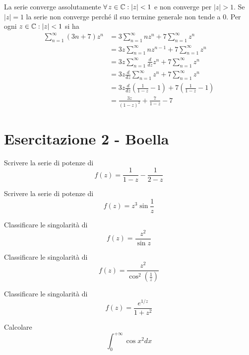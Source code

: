 La serie converge assolutamente $\forall z\in \CC  :\left| z\right| < 1$ e non converge per $\left| z\right|  > 1$. Se $\left| z\right| = 1$ la serie non converge perché il suo termine generale non tende a $0$. Per ogni $z\in \mathbb{C}  :\left| z\right| < 1$ si ha
\begin{align*}
\sum\limits^{\infty}_{n = 1}\left(3n + 7\right) z^{n} & = 3\sum\limits^{\infty}_{n = 1} nz^{n} + 7\sum\limits^{\infty}_{n = 1} z^{n}\\
 & = 3z\sum\limits^{\infty}_{n = 1} nz^{n - 1} + 7\sum\limits^{\infty}_{n = 1} z^{n}\\
 & = 3z\sum\limits^{\infty}_{n = 1}\frac{d}{dz} z^{n} + 7\sum\limits^{\infty}_{n = 1} z^{n}\\
 & = 3z\frac{d}{dz}\sum\limits^{\infty}_{n = 1} z^{n} + 7\sum\limits^{\infty}_{n = 1} z^{n}\\
 & = 3z\frac{d}{dz}\left(\frac{1}{1 - z} - 1\right) + 7\left(\frac{1}{1 - z} - 1\right)\\
 & = \frac{3z}{\left(1 - z\right)^{2}} + \frac{7}{1 - z} - 7
\end{align*}
\chapter{Esercitazione 2 - Boella}
\ParteEsercizi
\Esercizio{}

Scrivere la serie di potenze di
\begin{equation*}
f(z) = \frac{1}{1 - z} - \frac{1}{2 - z}
\end{equation*}
\Esercizio{}

Scrivere la serie di potenze di
\begin{equation*}
f(z) = z^{3}\sin\frac{1}{z}
\end{equation*}
\Esercizio{}

Classificare le singolarità di
\begin{equation*}
f(z) = \frac{z^{2}}{\sin z}
\end{equation*}
\Esercizio{}

Classificare le singolarità di
\begin{equation*}
f(z) = \frac{z^{2}}{\cos^{2}\left(\frac{1}{z}\right)}
\end{equation*}
\Esercizio{}

Classificare le singolarità di
\begin{equation*}
f(z) = \frac{e^{1/z}}{1 + z^{2}}
\end{equation*}

Calcolare
\begin{equation*}
\int^{+ \infty}_{0}\cos x^{2} dx
\end{equation*}
\ParteSoluzioni
\Soluzione

